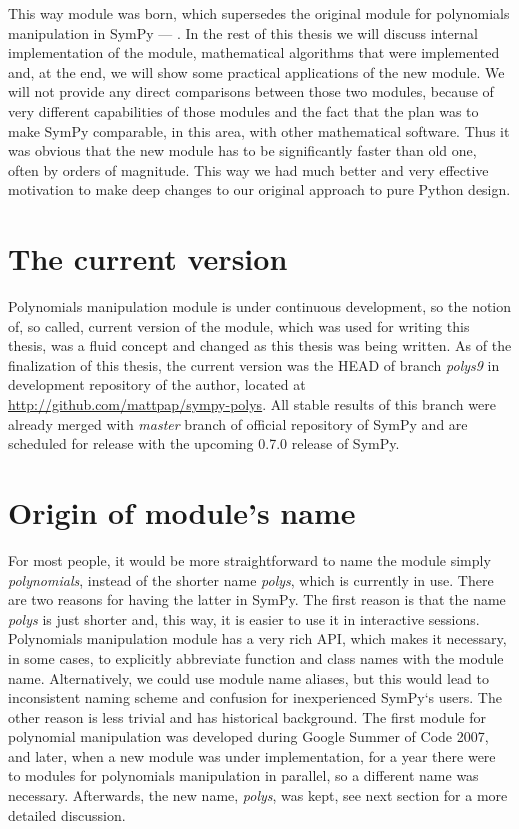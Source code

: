 This way  module was born, which supersedes the original module for polynomials
manipulation in SymPy --- . In the rest of this thesis we will discuss
internal implementation of the module, mathematical algorithms that were implemented and, at
the end, we will show some practical applications of the new module. We will not provide any
direct comparisons between those two modules, because of very different capabilities of those
modules and the fact that the plan was to make SymPy comparable, in this area, with other
mathematical software. Thus it was obvious that the new module has to be significantly faster
than old one, often by orders of magnitude. This way we had much better and very effective
motivation to make deep changes to our original approach to pure Python design.


\section{The current version}

Polynomials manipulation module is under continuous development, so the notion of, so called, current
version of the module, which was used for writing this thesis, was a fluid concept and changed as this
thesis was being written. As of the finalization of this thesis, the current version was the HEAD of
branch \emph{polys9} in development repository of the author, located at \href{http://github.com/mattpap/sympy-polys}{http://github.com/mattpap/sympy-polys}.
All stable results of this branch were already merged with \emph{master} branch of official repository of
SymPy and are scheduled for release with the upcoming 0.7.0 release of SymPy.


\section{Origin of module's name}

For most people, it would be more straightforward to name the module simply \emph{polynomials}, instead
of the shorter name \emph{polys}, which is currently in use. There are two reasons for having the latter
in SymPy. The first reason is that the name \emph{polys} is just shorter and, this way, it is easier to
use it in interactive sessions. Polynomials manipulation module has a very rich API, which makes it
necessary, in some cases, to explicitly abbreviate function and class names with the module name.
Alternatively, we could use module name aliases, but this would lead to inconsistent naming scheme
and confusion for inexperienced SymPy`s users. The other reason is less trivial and has historical
background. The first module for polynomial manipulation was developed during Google Summer of Code
2007, and later, when a new module was under implementation, for a year there were to modules for
polynomials manipulation in parallel, so a different name was necessary. Afterwards, the new name,
\emph{polys}, was kept, see next section for a more detailed discussion.


